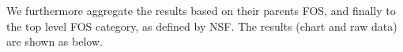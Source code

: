 \documentclass{sig-alternate}
\begin{document}

We furthermore aggregate the results based on their parents FOS, and
finally to the top level FOS category, as defined by NSF. The results
(chart and raw data) are shown as below.
\end{document}
